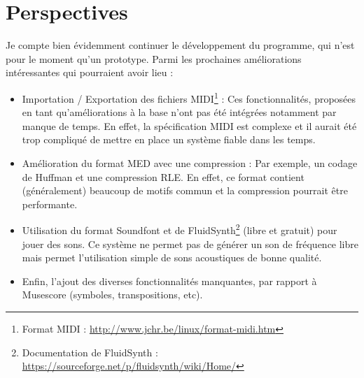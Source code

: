 \documentclass[12pt]{report}
\begin{document}
\chapter{Perspectives} %
Je compte bien évidemment continuer le développement du programme, qui n'est pour le moment qu'un prototype. Parmi les prochaines améliorations intéressantes qui pourraient avoir lieu :\\
\begin{itemize}
 \item Importation / Exportation des fichiers MIDI\footnote{Format MIDI : \url{http://www.jchr.be/linux/format-midi.htm}} : Ces fonctionnalités, proposées en tant qu'améliorations à la base n'ont pas été intégrées notamment par manque de temps. En effet, la spécification MIDI
 est complexe et il aurait été trop compliqué de mettre en place un système fiable dans les temps.\\
 \item Amélioration du format MED avec une compression : Par exemple, un codage de Huffman et une compression RLE. En effet, ce format contient (généralement) beaucoup de motifs commun et la compression
 pourrait être performante.\\
 \item Utilisation du format Soundfont et de FluidSynth\footnote{Documentation de FluidSynth : \url{https://sourceforge.net/p/fluidsynth/wiki/Home/}} (libre et gratuit) pour jouer des sons. Ce système ne permet pas de générer un son de fréquence libre mais permet
 l'utilisation simple de sons acoustiques de bonne qualité.\\
 \item Enfin, l'ajout des diverses fonctionnalités manquantes, par rapport à Musescore (symboles, transpositions, etc).\\
\end{itemize}
\end{document}
